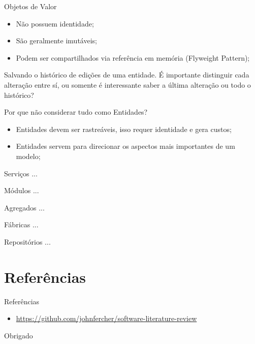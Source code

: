 \documentclass[aspectratio=169]{beamer}
\begin{document}
\begin{frame}{Objetos de Valor}	
	\begin{itemize}	
		\item Não possuem identidade;
		\item São geralmente imutáveis;
		\item Podem ser compartilhados via referência em memória (Flyweight Pattern);
	\end{itemize}

	Salvando o histórico de edições de uma entidade. É importante distinguir cada alteração entre sí, ou somente é interessante saber a última alteração ou todo o histórico?
\end{frame}

\begin{frame}{Por que não considerar tudo como Entidades?}	
	\begin{itemize}	
		\item Entidades devem ser rastreáveis, isso requer identidade e gera custos;
		\item Entidades servem para direcionar os aspectos mais importantes de um modelo;
	\end{itemize}
\end{frame}

\begin{frame}{Serviços}	
	...
\end{frame}

\begin{frame}{Módulos}	
	...
\end{frame}

\begin{frame}{Agregados}	
	...
\end{frame}

\begin{frame}{Fábricas}	
	...
\end{frame}

\begin{frame}{Repositórios}	
	...
\end{frame}

\section{Referências}
\begin{frame}{Referências}	
	\begin{itemize}	
		\item \href{https://github.com/johnfercher/software-literature-review}{https://github.com/johnfercher/software-literature-review}
	\end{itemize}
\end{frame}

\begin{frame}[standout]
  	Obrigado		
\end{frame}
\end{document}
